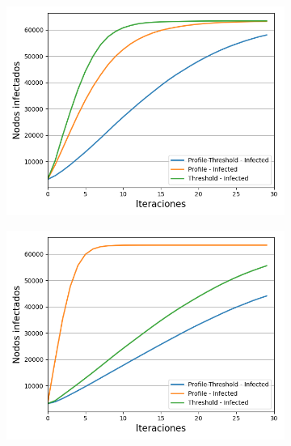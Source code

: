 \documentclass{article}
\begin{document}
\begin{figure}[!tbp]
\begin{subfigure}[b]{0.5\textwidth}
		\caption{}
		\label{fig:f32}
	\end{subfigure}
	\begin{subfigure}[b]{0.5\textwidth}
		\includegraphics[width=\textwidth, height=\textwidth]{../Images/Fig 3 c).png}
		\caption{}
		\label{fig:f33}
	\end{subfigure}
	\hfill
	\begin{subfigure}[b]{0.5\textwidth}
		\includegraphics[width=\textwidth, height=\textwidth]{../Images/Fig 3 d).png}

\end{subfigure}
\end{figure}
\end{document}
